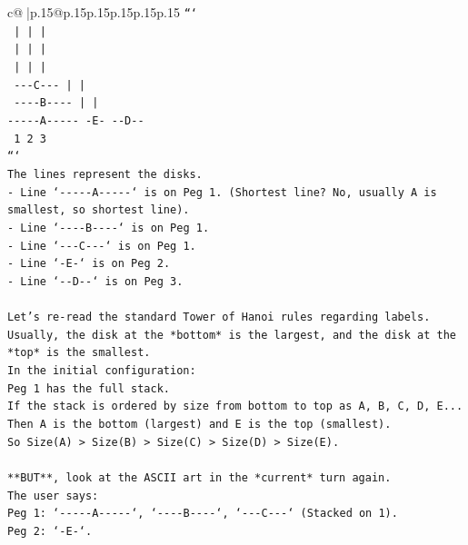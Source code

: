\documentclass{article}
\begin{document}
{\begin{supertabular}{c@{$\;$}|p{.15\linewidth}@{}p{.15\linewidth}p{.15\linewidth}p{.15\linewidth}p{.15\linewidth}p{.15\linewidth}}
{{{\texttt{```} \\
\texttt{     |           |           |     } \\
\texttt{     |           |           |     } \\
\texttt{     |           |           |     } \\
\texttt{  {-}{-}{-}C{-}{-}{-}        |           |     } \\
\texttt{ {-}{-}{-}{-}B{-}{-}{-}{-}       |           |     } \\
\texttt{{-}{-}{-}{-}{-}A{-}{-}{-}{-}{-}     {-}E{-}        {-}{-}D{-}{-}   } \\
\texttt{     1           2           3     } \\
\texttt{```} \\
\texttt{The lines represent the disks.} \\
\texttt{{-} Line `{-}{-}{-}{-}{-}A{-}{-}{-}{-}{-}` is on Peg 1. (Shortest line? No, usually A is smallest, so shortest line).} \\
\texttt{{-} Line `{-}{-}{-}{-}B{-}{-}{-}{-}` is on Peg 1.} \\
\texttt{{-} Line `{-}{-}{-}C{-}{-}{-}` is on Peg 1.} \\
\texttt{{-} Line `{-}E{-}` is on Peg 2.} \\
\texttt{{-} Line `{-}{-}D{-}{-}` is on Peg 3.} \\
\\ 
\texttt{Let's re{-}read the standard Tower of Hanoi rules regarding labels. Usually, the disk at the *bottom* is the largest, and the disk at the *top* is the smallest.} \\
\texttt{In the initial configuration:} \\
\texttt{Peg 1 has the full stack.} \\
\texttt{If the stack is ordered by size from bottom to top as A, B, C, D, E...} \\
\texttt{Then A is the bottom (largest) and E is the top (smallest).} \\
\texttt{So Size(A) > Size(B) > Size(C) > Size(D) > Size(E).} \\
\\ 
\texttt{**BUT**, look at the ASCII art in the *current* turn again.} \\
\texttt{The user says:} \\
\texttt{Peg 1: `{-}{-}{-}{-}{-}A{-}{-}{-}{-}{-}`, `{-}{-}{-}{-}B{-}{-}{-}{-}`, `{-}{-}{-}C{-}{-}{-}` (Stacked on 1).} \\
\texttt{Peg 2: `{-}E{-}`.} \\
}}}
\end{supertabular}}
\end{document}
